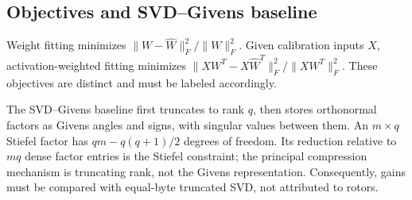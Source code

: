 \subsection{Objectives and SVD--Givens baseline}
Weight fitting minimizes $\|W-\widehat W\|_F^2/\|W\|_F^2$. Given calibration inputs $X$, activation-weighted fitting minimizes $\|XW^T-X\widehat W^T\|_F^2/\|XW^T\|_F^2$. These objectives are distinct and must be labeled accordingly.

The SVD--Givens baseline first truncates to rank $q$, then stores orthonormal factors as Givens angles and signs, with singular values between them. An $m\times q$ Stiefel factor has $qm-q(q+1)/2$ degrees of freedom. Its reduction relative to $mq$ dense factor entries is the Stiefel constraint; the principal compression mechanism is truncating rank, not the Givens representation. Consequently, gains must be compared with equal-byte truncated SVD, not attributed to rotors.

